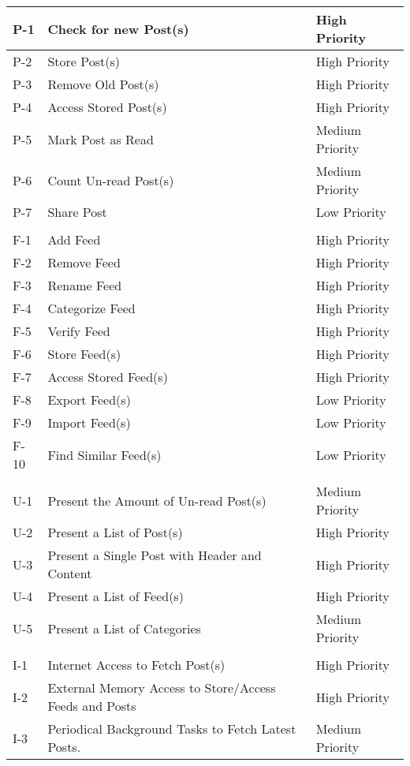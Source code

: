 \begin{center}
\begin{longtable}{ | l | p{8cm} | l | }
    P-1 & Check for new Post(s) & High Priority \\ \hline
    P-2 & Store Post(s) & High Priority \\ \hline
    P-3 & Remove Old Post(s) & High Priority \\ \hline
    P-4 & Access Stored Post(s) & High Priority \\ \hline
    P-5 & Mark Post as Read & Medium Priority \\ \hline
    P-6 & Count Un-read Post(s) & Medium Priority \\ \hline
    P-7 & Share Post & Low Priority \\ \hline
     &  &  \\ \hline
    F-1 & Add Feed & High Priority \\ \hline
    F-2 & Remove Feed & High Priority \\ \hline
    F-3 & Rename Feed & High Priority \\ \hline
    F-4 & Categorize Feed & High Priority \\ \hline
    F-5 & Verify Feed & High Priority \\ \hline
    F-6 & Store Feed(s) & High Priority \\ \hline
    F-7 & Access Stored Feed(s) & High Priority \\ \hline
    F-8 & Export Feed(s) & Low Priority \\ \hline
    F-9 & Import Feed(s) & Low Priority \\ \hline
    F-10 & Find Similar Feed(s) & Low Priority \\ \hline
     &  &  \\ \hline
    U-1 & Present the Amount of Un-read Post(s) & Medium Priority \\ \hline
    U-2 & Present a List of Post(s) & High Priority \\ \hline
    U-3 & Present a Single Post with Header and Content & High Priority \\ \hline
    U-4 & Present a List of Feed(s) & High Priority \\ \hline
    U-5 & Present a List of Categories & Medium Priority \\ \hline
     &  &  \\ \hline
    I-1 & Internet Access to Fetch Post(s) & High Priority \\ \hline
    I-2 & External Memory Access to Store/Access Feeds and Posts & High Priority \\ \hline
    I-3 & Periodical Background Tasks to Fetch Latest Posts. & Medium Priority \\ \hline

\end{longtable}
\end{center}
